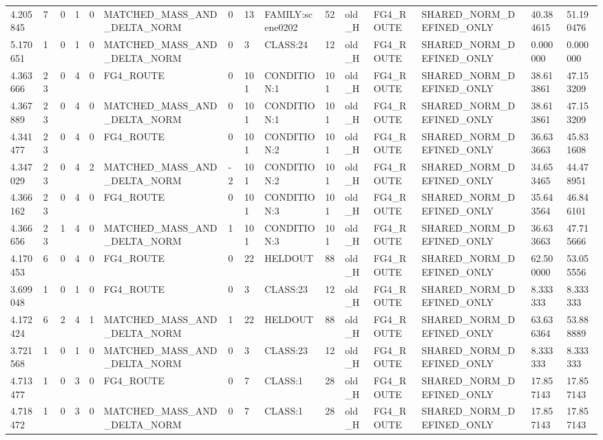 \begin{tabular}{lllllllllllllll}
4.205845 & 7 & 0 & 1 & 0 & MATCHED\_MASS\_AND\_DELTA\_NORM & 0 & 13 & FAMILY:scene0202 & 52 & old\_H & FG4\_ROUTE & SHARED\_NORM\_DEFINED\_ONLY & 40.384615 & 51.190476 \\
5.170651 & 1 & 0 & 1 & 0 & MATCHED\_MASS\_AND\_DELTA\_NORM & 0 & 3 & CLASS:24 & 12 & old\_H & FG4\_ROUTE & SHARED\_NORM\_DEFINED\_ONLY & 0.000000 & 0.000000 \\
4.363666 & 23 & 0 & 4 & 0 & FG4\_ROUTE & 0 & 101 & CONDITION:1 & 101 & old\_H & FG4\_ROUTE & SHARED\_NORM\_DEFINED\_ONLY & 38.613861 & 47.153209 \\
4.367889 & 23 & 0 & 4 & 0 & MATCHED\_MASS\_AND\_DELTA\_NORM & 0 & 101 & CONDITION:1 & 101 & old\_H & FG4\_ROUTE & SHARED\_NORM\_DEFINED\_ONLY & 38.613861 & 47.153209 \\
4.341477 & 23 & 0 & 4 & 0 & FG4\_ROUTE & 0 & 101 & CONDITION:2 & 101 & old\_H & FG4\_ROUTE & SHARED\_NORM\_DEFINED\_ONLY & 36.633663 & 45.831608 \\
4.347029 & 23 & 0 & 4 & 2 & MATCHED\_MASS\_AND\_DELTA\_NORM & -2 & 101 & CONDITION:2 & 101 & old\_H & FG4\_ROUTE & SHARED\_NORM\_DEFINED\_ONLY & 34.653465 & 44.478951 \\
4.366162 & 23 & 0 & 4 & 0 & FG4\_ROUTE & 0 & 101 & CONDITION:3 & 101 & old\_H & FG4\_ROUTE & SHARED\_NORM\_DEFINED\_ONLY & 35.643564 & 46.846101 \\
4.366656 & 23 & 1 & 4 & 0 & MATCHED\_MASS\_AND\_DELTA\_NORM & 1 & 101 & CONDITION:3 & 101 & old\_H & FG4\_ROUTE & SHARED\_NORM\_DEFINED\_ONLY & 36.633663 & 47.715666 \\
4.170453 & 6 & 0 & 4 & 0 & FG4\_ROUTE & 0 & 22 & HELDOUT & 88 & old\_H & FG4\_ROUTE & SHARED\_NORM\_DEFINED\_ONLY & 62.500000 & 53.055556 \\
3.699048 & 1 & 0 & 1 & 0 & FG4\_ROUTE & 0 & 3 & CLASS:23 & 12 & old\_H & FG4\_ROUTE & SHARED\_NORM\_DEFINED\_ONLY & 8.333333 & 8.333333 \\
4.172424 & 6 & 2 & 4 & 1 & MATCHED\_MASS\_AND\_DELTA\_NORM & 1 & 22 & HELDOUT & 88 & old\_H & FG4\_ROUTE & SHARED\_NORM\_DEFINED\_ONLY & 63.636364 & 53.888889 \\
3.721568 & 1 & 0 & 1 & 0 & MATCHED\_MASS\_AND\_DELTA\_NORM & 0 & 3 & CLASS:23 & 12 & old\_H & FG4\_ROUTE & SHARED\_NORM\_DEFINED\_ONLY & 8.333333 & 8.333333 \\
4.713477 & 1 & 0 & 3 & 0 & FG4\_ROUTE & 0 & 7 & CLASS:1 & 28 & old\_H & FG4\_ROUTE & SHARED\_NORM\_DEFINED\_ONLY & 17.857143 & 17.857143 \\
4.718472 & 1 & 0 & 3 & 0 & MATCHED\_MASS\_AND\_DELTA\_NORM & 0 & 7 & CLASS:1 & 28 & old\_H & FG4\_ROUTE & SHARED\_NORM\_DEFINED\_ONLY & 17.857143 & 17.857143 \\

\end{tabular}
